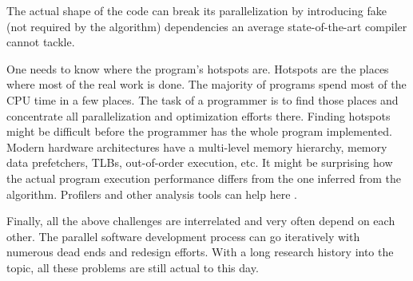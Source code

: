 \begin{description}[style=unboxed,leftmargin=0cm]
The actual shape of the code can break its parallelization by introducing fake (not required by the algorithm) dependencies an average state-of-the-art compiler cannot tackle.
\item[Performance analysis and tuning] One needs to know where the program's hotspots are. Hotspots are the places where most of the real work is done. The majority of programs spend most of the CPU time in a few places. The task of a programmer is to find those places and concentrate all parallelization and optimization efforts there. Finding hotspots might be difficult before the programmer has the whole program implemented. Modern hardware architectures have a multi-level memory hierarchy, memory data prefetchers, TLBs, out-of-order execution, etc. It might be surprising how the actual program execution performance differs from the one inferred from the algorithm. Profilers and other analysis tools can help here \cite{perf-tool}.
\end{description}
\quad Finally, all the above challenges are interrelated and very often depend on each other. The parallel software development process can go iteratively with numerous dead ends and redesign efforts. With a long research history into the topic, all these problems are still actual to this day.
